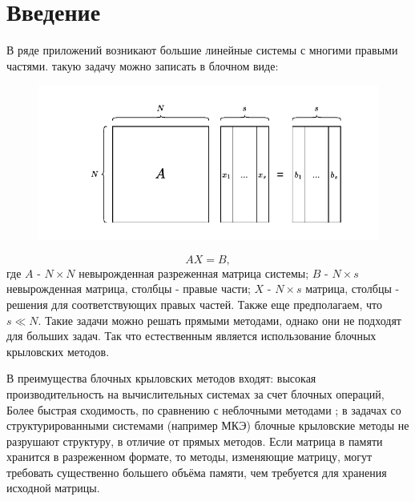 \section{Введение}
\label{sec:Chapter0} 
В ряде приложений возникают большие линейные системы с многими правыми частями. такую задачу можно записать в блочном виде:\\
\begin{figure}[H]
    \centering
    \includegraphics[width=0.5\linewidth]{images/system.pdf}
    \label{fig:system}
\end{figure}
$$AX=B,$$
где $A$ - $N\times N$ невырожденная разреженная матрица системы;
$B$ - $N\times s$ невырожденная матрица, столбцы - правые части; 
$X$ - $N\times s$ матрица, столбцы - решения для соответствующих правых частей. 
Также еще предполагаем, что $s\ll N$.
Такие задачи можно решать прямыми методами, однако они не подходят для больших 
задач. Так что естественным является использование 
блочных крыловских методов.

\par В преимущества блочных крыловских методов входят:
высокая производительность на вычислительных системах за счет блочных операций,
Более быстрая сходимость, по сравнению с неблочными методами \cite{OLEARY1980293}; 
в задачах со структурированными системами (например МКЭ) блочные крыловские методы не разрушают структуру,
в отличие от прямых методов.
Если матрица в памяти хранится в разреженном формате, то методы, изменяющие матрицу, могут требовать существенно большего объёма памяти, чем требуется для хранения исходной матрицы. 

